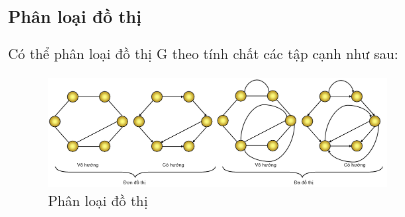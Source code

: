 \subsubsection{Phân loại đồ thị}
Có thể phân loại đồ thị G theo tính chất các tập cạnh như sau:\\
\begin{figure}[H] %
    \centering %
    \includegraphics[width=0.8\textwidth]{assets/phanloaidothi.png} 
    \caption{Phân loại đồ thị} %
    \label{fig:gr_1.2.2}
\end{figure}

